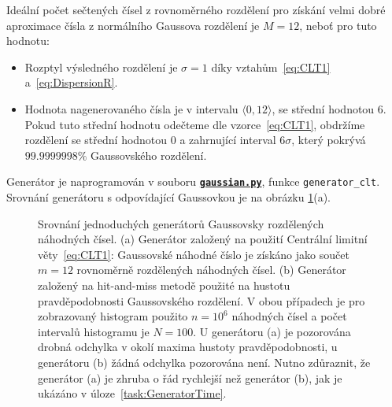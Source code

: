 \documentclass[a4paper,11pt,twoside]{article}
\def\code#1{\textnormal{\texttt{#1}}}
\def\ghfile#1#2{\textnormal{\textbf{\texttt{\href{https://github.com/PavelStransky/PCInPhysics/blob/main/#1#2}{#2}}}}}
\theoremstyle{red}
\theoremstyle{green}
\begin{document}
    \begin{solution}
        Ideální počet sečtených čísel z rovnoměrného rozdělení pro získání velmi dobré aproximace čísla z normálního Gaussova rozdělení je $M=12$, neboť pro tuto hodnotu:
        \begin{itemize}
            \item Rozptyl výsledného rozdělení je $\sigma=1$ díky vztahům~\eqref{eq:CLT1} a~\eqref{eq:DispersionR}.
            \item Hodnota nagenerovaného čísla je v intervalu $\langle0,12\rangle$, se střední hodnotou $6$.
                Pokud tuto střední hodnotu odečteme dle vzorce~\eqref{eq:CLT1}, obdržíme rozdělení se střední hodnotou $0$ a zahrnující interval $6\sigma$, který pokrývá $99.9999998\%$ Gaussovského rozdělení.
        \end{itemize}
        Generátor je naprogramován v souboru \ghfile{python/histogram/}{gaussian.py}, funkce \code{generator_clt}.
        Srovnání generátoru s odpovídající Gaussovkou je na obrázku \ref{fig:GaussianGenerator}(a).

        \begin{figure}[!htb]
            \begin{subfigure}{0.49\linewidth}
                \centering{}
                \caption{}
            \end{subfigure}
            \begin{subfigure}{0.49\linewidth}
                \centering{}
                \caption{}
            \end{subfigure}
            \caption{
                \protect\small
                Srovnání jednoduchých generátorů Gaussovsky rozdělených náhodných čísel. 
                (a) Generátor založený na použití Centrální limitní věty~\eqref{eq:CLT1}: Gaussovské náhodné číslo je získáno jako součet $m=12$ rovnoměrně rozdělených náhodných čísel.
                (b) Generátor založený na hit-and-miss metodě použité na hustotu pravděpodobnosti Gaussovského rozdělení.
                V obou případech je pro zobrazovaný histogram použito  $n=10^{6}$ náhodných čísel a počet intervalů histogramu je $N=100$.
                U generátoru (a) je pozorována drobná odchylka v okolí maxima hustoty pravděpodobnosti, u generátoru (b) žádná odchylka pozorována není.
                Nutno zdůraznit, že generátor (a) je zhruba o řád rychlejší než generátor (b), jak je ukázáno v úloze~\ref{task:GeneratorTime}.
            }
            \label{fig:GaussianGenerator}
        \end{figure}    
    \end{solution}
    
\end{document}
